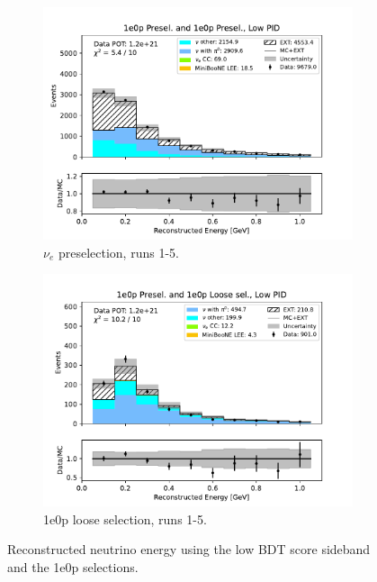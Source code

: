 \begin{figure}[H]
\begin{subfigure}{0.5\linewidth}
        \includegraphics[width=\linewidth]{technote/Sidebands/Figures/FarSideband/far_sideband_reco_e_run1234a4b4c4d5_ZP_ZP_LOW_PID.pdf}
        \caption{$\nu_e$ preselection, runs 1-5.}
    \end{subfigure}%
    \begin{subfigure}{0.5\linewidth}
        \includegraphics[width=\linewidth]{technote/Sidebands/Figures/FarSideband/far_sideband_reco_e_run1234a4b4c4d5_ZP_ZPLOOSESEL_LOW_PID.pdf}
        \caption{1e0p loose selection, runs 1-5.}
    \end{subfigure}
    \caption{Reconstructed neutrino energy using the low BDT score sideband and the 1e0p selections.}
\end{figure}
